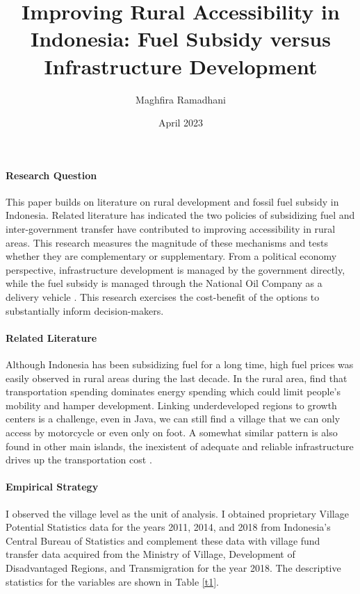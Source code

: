 \documentclass[letterpaper,11pt,leqno]{article}
\begin{document}
\title{Improving Rural Accessibility in Indonesia: Fuel Subsidy versus Infrastructure Development}
\author{Maghfira Ramadhani}
\date{April 2023}       
\maketitle
 
\paragraph{Research Question} This paper builds on literature on rural development and fossil fuel subsidy in Indonesia. Related literature has indicated the two policies of subsidizing fuel and inter-government transfer have contributed to improving accessibility in rural areas. This research measures the magnitude of these mechanisms and tests whether they are complementary or supplementary. From a political economy perspective, infrastructure development is managed by the government directly, while the fuel subsidy is managed through the National Oil Company as a delivery vehicle \citep{ichsan_2022}. This research exercises the cost-benefit of the options to substantially inform decision-makers.

\paragraph{Related Literature} Although Indonesia has been subsidizing fuel for a long time, high fuel prices was easily observed in rural areas during the last decade. In the rural area, \citet{sambodo_2019} find that transportation spending dominates energy spending which could limit people's mobility and hamper development. Linking underdeveloped regions to growth centers is a challenge, even in Java, we can still find a village that we can only access by motorcycle or even only on foot. A somewhat similar pattern is also found in other main islands, the inexistent of adequate and reliable infrastructure drives up the transportation cost \citep{sandee_2016}.


\paragraph{Empirical Strategy} I observed the village level as the unit of analysis. I obtained proprietary Village Potential Statistics data for the years 2011, 2014, and 2018 from Indonesia's Central Bureau of Statistics and complement these data with village fund transfer data acquired from the Ministry of Village, Development of Disadvantaged Regions, and Transmigration for the year 2018. The descriptive statistics for the variables are shown in Table \ref{t1}.
\end{document}
